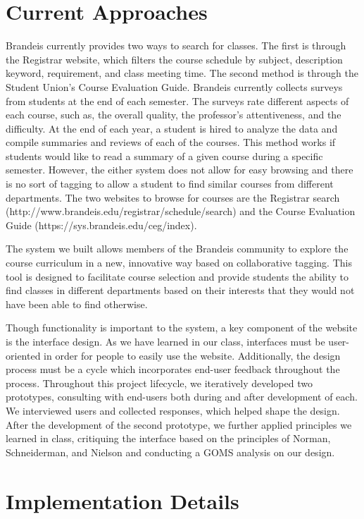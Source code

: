 \documentclass[12pt]{report}
\begin{document}
\section{Current Approaches}

Brandeis currently provides two ways to search for classes. The first is through the Registrar website, which filters the course schedule by subject, description keyword, requirement, and class meeting time. The second method is through the Student Union's Course Evaluation Guide. Brandeis currently collects surveys from students at the end of each semester. The surveys rate different aspects of each course, such as, the overall quality, the professor's attentiveness, and the difficulty. At the end of each year, a student is hired to analyze the data and compile summaries and reviews of each of the courses. This method works if students would like to read a summary of a given course during a specific semester. However, the either system does not allow for easy browsing and there is no sort of tagging to allow a student to find similar courses from different departments. The two websites to browse for courses are the Registrar search (http://www.brandeis.edu/registrar/schedule/search) and the Course Evaluation Guide (https://sys.brandeis.edu/ceg/index).

The system we built allows members of the Brandeis community to explore the course curriculum in a new, innovative way based on collaborative tagging. This tool is designed to facilitate course selection and provide students the ability to find classes in different departments based on their interests that they would not have been able to find otherwise.

Though functionality is important to the system, a key component of the website is the interface design.  As we have learned in our class, interfaces must be user-oriented in order for people to easily use the website. Additionally, the design process must be a cycle which incorporates end-user feedback throughout the process. Throughout this project lifecycle, we iteratively developed two prototypes, consulting with end-users both during and after development of each. We interviewed users and collected responses, which helped shape the design. After the development of the second prototype, we further applied principles we learned in class, critiquing the interface based on the principles of Norman, Schneiderman, and Nielson and conducting a GOMS analysis on our design.

\section{Implementation Details}
\end{document}
